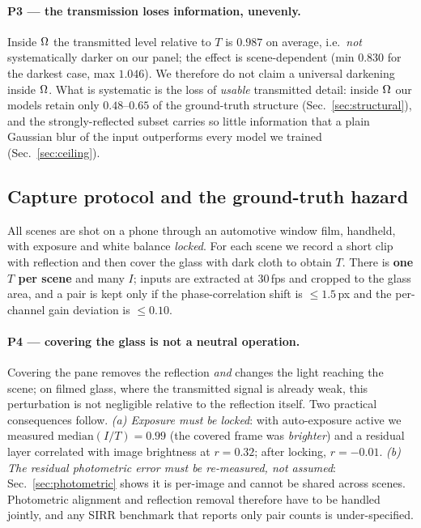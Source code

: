 \paragraph{P3 --- the transmission loses information, unevenly.}
Inside $\Omega$ the transmitted level relative to $T$ is $0.987$ on average, i.e.\
\emph{not} systematically darker on our panel; the effect is scene-dependent
(min $0.830$ for the darkest case, max $1.046$). We therefore do not claim a universal
darkening inside $\Omega$. What is systematic is the loss of \emph{usable} transmitted
detail: inside $\Omega$ our models retain only $0.48$--$0.65$ of the ground-truth structure
(Sec.~\ref{sec:structural}), and the strongly-reflected subset carries so little
information that a plain Gaussian blur of the input outperforms every model we trained
(Sec.~\ref{sec:ceiling}).

\subsection{Capture protocol and the ground-truth hazard}
\label{sec:protocol}

All scenes are shot on a phone through an automotive window film, handheld, with exposure
and white balance \emph{locked}. For each scene we record a short clip with reflection and
then cover the glass with dark cloth to obtain $T$. There is \textbf{one $T$ per scene}
and many $I$; inputs are extracted at $30$\,fps and cropped to the glass area, and a pair
is kept only if the phase-correlation shift is $\le1.5$\,px and the per-channel gain
deviation is $\le0.10$.

\paragraph{P4 --- covering the glass is not a neutral operation.}
Covering the pane removes the reflection \emph{and} changes the light reaching the scene;
on filmed glass, where the transmitted signal is already weak, this perturbation is not
negligible relative to the reflection itself. Two practical consequences follow.
\emph{(a) Exposure must be locked}: with auto-exposure active we measured
$\mathrm{median}(I/T)=0.99$ (the covered frame was \emph{brighter}) and a residual layer
correlated with image brightness at $r=0.32$; after locking, $r=-0.01$. \emph{(b) The
residual photometric error must be re-measured, not assumed}: Sec.~\ref{sec:photometric}
shows it is per-image and cannot be shared across scenes. Photometric alignment and
reflection removal therefore have to be handled jointly, and any SIRR benchmark that
reports only pair counts is under-specified.

